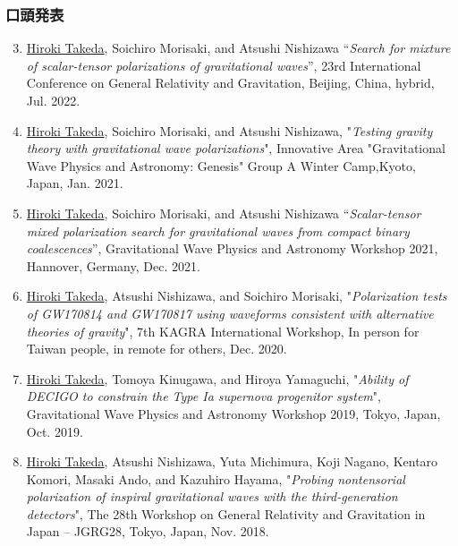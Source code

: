 \documentclass[uplatex, 11pt]{jsarticle}
\begin{document}
\subsubsection*{口頭発表}
\begin{enumerate}
\setcounter{enumi}{2}
\item \uline{Hiroki Takeda}, Soichiro Morisaki, and Atsushi Nishizawa “\emph{Search for mixture of scalar-tensor polarizations of gravitational waves}”, 23rd International Conference on General Relativity and Gravitation, Beijing, China, hybrid, Jul. 2022.\\

\item \uline{Hiroki Takeda}, Soichiro Morisaki, and Atsushi Nishizawa,
"\emph{Testing gravity theory with gravitational wave polarizations}",
Innovative Area "Gravitational Wave Physics and Astronomy: Genesis" Group A Winter Camp,Kyoto, Japan, Jan. 2021.\\

\item \uline{Hiroki Takeda}, Soichiro Morisaki, and Atsushi Nishizawa “\emph{Scalar-tensor mixed polarization search for gravitational waves from compact binary coalescences}”, Gravitational Wave Physics and Astronomy Workshop 2021, Hannover, Germany, Dec. 2021.\\

\item \uline{Hiroki Takeda}, Atsushi Nishizawa, and Soichiro Morisaki, "\emph{Polarization tests of GW170814 and GW170817 using waveforms consistent with alternative theories of gravity}", 7th KAGRA International Workshop, In person for Taiwan people, in remote for others, Dec. 2020.\\

\item \uline{Hiroki Takeda}, Tomoya Kinugawa, and Hiroya Yamaguchi, "\emph{Ability of DECIGO to constrain the Type Ia supernova progenitor system}", Gravitational Wave Physics and Astronomy Workshop 2019, Tokyo, Japan, Oct. 2019.\\

\item \uline{Hiroki Takeda}, Atsushi Nishizawa, Yuta Michimura, Koji Nagano, Kentaro Komori, Masaki Ando, and Kazuhiro Hayama, "\emph{Probing nontensorial polarization of inspiral gravitational waves with the third-generation detectors}", The 28th Workshop on General Relativity and Gravitation in Japan – JGRG28, Tokyo, Japan, Nov. 2018.\\


\end{enumerate}
\end{document}
